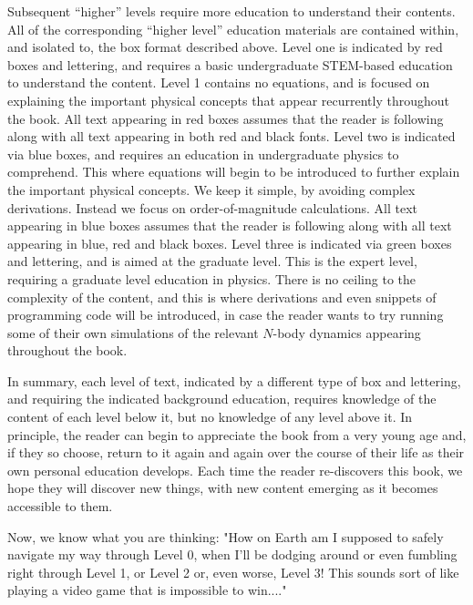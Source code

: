 \documentclass[main.tex]{subfiles}
\begin{document}
\par \nar Subsequent “higher” levels require more education to understand their contents.  All of the corresponding “higher level” education materials are contained within, and isolated to, the box format described above.  Level one is indicated by red boxes and lettering, and requires a basic undergraduate STEM-based education to understand the content.  Level 1 contains no equations, and is focused on explaining the important physical concepts that appear recurrently throughout the book.  All text appearing in red boxes assumes that the reader is following along with all text appearing in both red and black fonts.  Level two is indicated via blue boxes, and requires an education in undergraduate physics to comprehend.  This where equations will begin to be introduced to further explain the important physical concepts.  We keep it simple, by avoiding complex derivations.  Instead we focus on order-of-magnitude calculations.  All text appearing in blue boxes assumes that the reader is following along with all text appearing in blue, red and black boxes.  Level three is indicated via green boxes and lettering, and is aimed at the graduate level.  This is the expert level, requiring a graduate level education in physics.  There is no ceiling to the complexity of the content, and this is where derivations and even snippets of programming code will be introduced, in case the reader wants to try running some of their own simulations of the relevant $N$-body dynamics appearing throughout the book.  %

\par \nar In summary, each level of text, indicated by a different type of box and lettering, and requiring the indicated background education, requires knowledge of the content of each level below it, but no knowledge of any level above it.  In principle, the reader can begin to appreciate the book from a very young age and, if they so choose, return to it again and again over the course of their life as their own personal education develops.  Each time the reader re-discovers this book, we hope they will discover new things, with new content emerging as it becomes accessible to them.

\par \nar Now, we know what you are thinking:  "How on Earth am I supposed to safely navigate my way through Level 0, when I'll be dodging around or even fumbling right through Level 1, or Level 2 or, even worse, Level 3!  This sounds sort of like playing a video game that is impossible to win...." 
\end{document}
